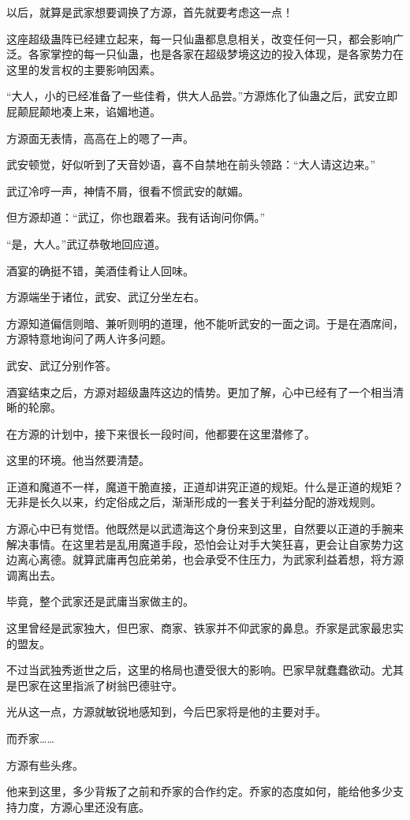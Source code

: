 \begin{this_body}
以后，就算是武家想要调换了方源，首先就要考虑这一点！

这座超级蛊阵已经建立起来，每一只仙蛊都息息相关，改变任何一只，都会影响广泛。各家掌控的每一只仙蛊，也是各家在超级梦境这边的投入体现，是各家势力在这里的发言权的主要影响因素。

“大人，小的已经准备了一些佳肴，供大人品尝。”方源炼化了仙蛊之后，武安立即屁颠屁颠地凑上来，谄媚地道。

方源面无表情，高高在上的嗯了一声。

武安顿觉，好似听到了天音妙语，喜不自禁地在前头领路：“大人请这边来。”

武辽冷哼一声，神情不屑，很看不惯武安的献媚。

但方源却道：“武辽，你也跟着来。我有话询问你俩。”

“是，大人。”武辽恭敬地回应道。

酒宴的确挺不错，美酒佳肴让人回味。

方源端坐于诸位，武安、武辽分坐左右。

方源知道偏信则暗、兼听则明的道理，他不能听武安的一面之词。于是在酒席间，方源特意地询问了两人许多问题。

武安、武辽分别作答。

酒宴结束之后，方源对超级蛊阵这边的情势。更加了解，心中已经有了一个相当清晰的轮廓。

在方源的计划中，接下来很长一段时间，他都要在这里潜修了。

这里的环境。他当然要清楚。

正道和魔道不一样，魔道干脆直接，正道却讲究正道的规矩。什么是正道的规矩？无非是长久以来，约定俗成之后，渐渐形成的一套关于利益分配的游戏规则。

方源心中已有觉悟。他既然是以武遗海这个身份来到这里，自然要以正道的手腕来解决事情。在这里若是乱用魔道手段，恐怕会让对手大笑狂喜，更会让自家势力这边离心离德。就算武庸再包庇弟弟，也会承受不住压力，为武家利益着想，将方源调离出去。

毕竟，整个武家还是武庸当家做主的。

这里曾经是武家独大，但巴家、商家、铁家并不仰武家的鼻息。乔家是武家最忠实的盟友。

不过当武独秀逝世之后，这里的格局也遭受很大的影响。巴家早就蠢蠢欲动。尤其是巴家在这里指派了树翁巴德驻守。

光从这一点，方源就敏锐地感知到，今后巴家将是他的主要对手。

而乔家……

方源有些头疼。

他来到这里，多少背叛了之前和乔家的合作约定。乔家的态度如何，能给他多少支持力度，方源心里还没有底。


\end{this_body}
